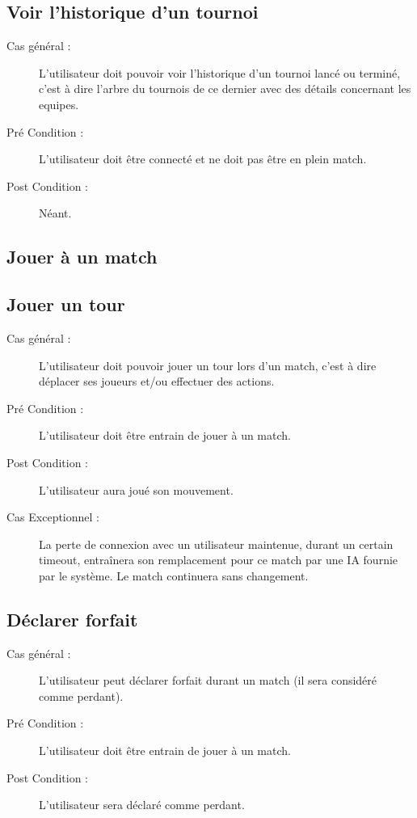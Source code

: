 \documentclass[a4paper]{report}
\begin{document}
\subsection{Voir l'historique d'un tournoi}
\begin{description}
    \item[Cas général :] L'\gls{utilisateur} doit pouvoir voir l'historique d'un tournoi lancé ou terminé, c'est à dire l'arbre du tournois de ce dernier avec des détails concernant les \glspl{equipe}.
    \item[Pré Condition  :] L'\gls{utilisateur} doit être connecté et ne doit pas être en plein match.
    \item[Post Condition :] Néant.
\end{description}

\subsection{Jouer à un match}
\subsection{Jouer un tour}
\begin{description}
    \item[Cas général :] L'\gls{utilisateur} doit pouvoir jouer un tour lors d'un match, c'est à dire déplacer ses \glspl{joueur} et/ou effectuer des actions.
    \item[Pré Condition  :] L'\gls{utilisateur} doit être entrain de jouer à un match.
    \item[Post Condition :] L'\gls{utilisateur} aura joué son mouvement.
    \item[Cas Exceptionnel :] La perte de connexion avec un \gls{utilisateur} maintenue, durant un certain timeout, entraînera son remplacement pour ce match par une IA fournie par le système. Le match continuera sans changement.
\end{description}
\subsection{Déclarer forfait}
\begin{description}
    \item[Cas général :] L'\gls{utilisateur} peut déclarer forfait durant un match (il sera considéré comme perdant).
    \item[Pré Condition  :] L'\gls{utilisateur} doit être entrain de jouer à un match.
    \item[Post Condition :] L'\gls{utilisateur} sera déclaré comme perdant.
\end{description}
\end{document}
